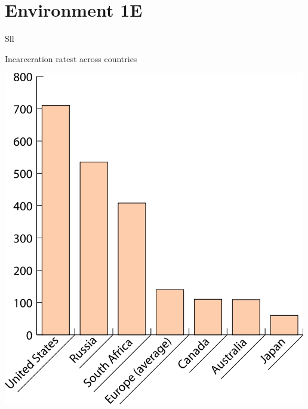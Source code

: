 
\section{Environment 1E}


\begin{chart}{S}{ll}
\caption{Incarceration ratest across countries}
\label{chart:incarceration}
\includegraphics[width=\chartwidth,height=\chartheight]{incarceration}  
\end{chart}


